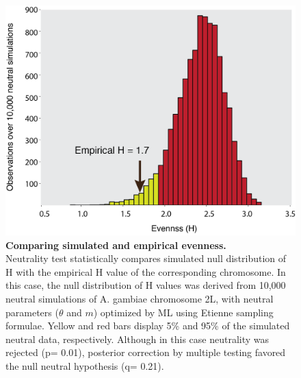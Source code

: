 \begin{figure}[htpb]
\centering 
\includegraphics[width=\textwidth]{tex_source/figures/untb_genomes/shannon_distrib.png}
\caption[Comparing simulated and empirical evenness.]{{\bf Comparing simulated and empirical evenness. }\\Neutrality test statistically compares simulated null distribution of H with the empirical H value of the corresponding chromosome. In this case, the null distribution of H values was derived from 10,000 neutral simulations of A. gambiae chromosome 2L, with neutral parameters ($\theta$ and $m$) optimized by ML using Etienne sampling formulae. Yellow and red bars display 5\% and 95\% of the simulated neutral data, respectively. Although in this case neutrality was rejected (p= 0.01), posterior correction by multiple testing favored the null neutral hypothesis (q= 0.21).}
\label{fig:shannon_distrib}
\end{figure}



